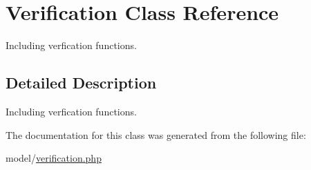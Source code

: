 \hypertarget{classVerification}{\section{Verification Class Reference}
\label{classVerification}
}


Including verfication functions.  




\subsection{Detailed Description}
Including verfication functions. 

The documentation for this class was generated from the following file\-:\begin{DoxyCompactItemize}
\item 
model/\hyperlink{verification_8php}{verification.\-php}\end{DoxyCompactItemize}
